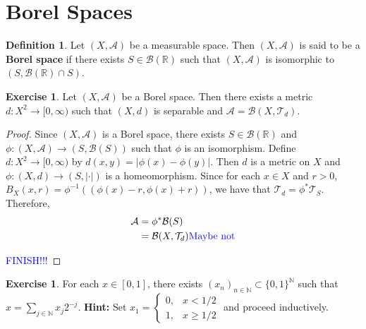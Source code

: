 \documentclass{book}
\theoremstyle{definition}
\newtheorem{defn}[definition]{Definition}
\newtheorem{ex}[definition]{Exercise}
\newcommand{\N}{\mathbb{N}}
\newcommand{\R}{\mathbb{R}}
\newcommand{\MA}{\mathcal{A}}
\newcommand{\MB}{\mathcal{B}}
\newcommand{\MT}{\mathcal{T}}
\newcommand{\lex}[1]{\label{ex:#1}}
\DeclareMathOperator*{\0}{\mbf{0}}
\DeclareMathOperator*{\1}{\mbf{1}}
\newcommand{\tcb}[1]{\textcolor{blue}{#1}}
\newcommand{\Rg}{[0,\infty)}
\begin{document}
	
	
	
	
	
	
	
	
	
	
	
	
	
	
	
	
	
	
	
	
	
	
	
	
	
	
	
	
	
	
	
	
	
	
	
	\newpage
	\section{Borel Spaces}
	
	\begin{defn} \lex{28007} 
		Let $(X, \MA)$ be a measurable space. Then $(X, \MA)$ is said to be a \textbf{Borel space} if there exists $S \in \MB(\R)$ such that $(X, \MA)$ is isomorphic to $(S, \MB(\R) \cap S)$.
	\end{defn}
	
	\begin{ex}
		Let $(X, \MA)$ be a Borel space. Then there exists a metric $d:X^2 \rightarrow \Rg$ such that $(X, d)$ is separable and $\MA = \MB(X, \MT_{d})$.
	\end{ex}
	
	\begin{proof}
		Since $(X, \MA)$ is a Borel space, there exists $S \in \MB(\R)$ and $\phi: (X, \MA) \rightarrow (S, \MB(S))$ such that $\phi$ is an isomorphism. Define $d: X^2 \rightarrow \Rg$ by $d(x,y) = |\phi(x) - \phi(y)|$. Then $d$ is a metric on $X$ and $\phi: (X, d) \rightarrow (S, |\cdot|)$ is a homeomorphism. Since for each $x \in X$ and $r > 0$, $B_X(x, r) = \phi^{-1}((\phi(x) - r, \phi(x) + r))$, we have that $\MT_d = \phi^*\MT_{S}$. Therefore, 
		\begin{align*}
			\MA 
			& = \phi^* \MB(S) \\
			& = \MB(X, \MT_d)  \text{\tcb{ Maybe not}}
		\end{align*} 
		
		\tcb{FINISH!!!}
	\end{proof}
	
	\begin{ex} \lex{28001} 
		For each $x \in [0, 1]$, there exists $(x_n)_{n \in \N} \subset \{0,1\}^{\N}$ such that $x = \sum\limits_{j \in \N} x_j2^{-j}$.
		\textbf{Hint:} Set $x_1 = 
		\begin{cases}
			0, & x < 1/2 \\
			1, & x \geq 1/2 
		\end{cases}$
		and proceed inductively. 
	\end{ex}
	
\end{document}
